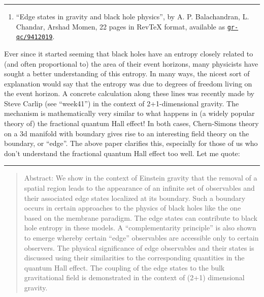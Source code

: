 \documentclass{article}
\def\tightlist{}
\begin{document}
\begin{center}\rule{0.5\linewidth}{0.5pt}\end{center}

\begin{enumerate}
\def\labelenumi{\arabic{enumi})}
\setcounter{enumi}{5}
\tightlist
\item
  ``Edge states in gravity and black hole physics'', by A. P.
  Balachandran, L. Chandar, Arshad Momen, 22 pages in RevTeX format,
  available as
  \href{http://xxx.lanl.gov/abs/gr-qc/9412019}{\texttt{gr-qc/9412019}}.
\end{enumerate}

Ever since it started seeming that black holes have an entropy closely
related to (and often proportional to) the area of their event horizons,
many physicists have sought a better understanding of this entropy. In
many ways, the nicest sort of explanation would say that the entropy was
due to degrees of freedom living on the event horizon. A concrete
calculation along these lines was recently made by Steve Carlip (see
``week41'') in the context of 2+1-dimensional gravity. The mechanism is
mathematically very similar to what happens in (a widely popular theory
of) the fractional quantum Hall effect! In both cases, Chern-Simons
theory on a 3d manifold with boundary gives rise to an interesting field
theory on the boundary, or ``edge''. The above paper clarifies this,
especially for those of us who don't understand the fractional quantum
Hall effect too well. Let me quote:

\begin{center}\rule{0.5\linewidth}{0.5pt}\end{center}

\begin{quote}
Abstract: We show in the context of Einstein gravity that the removal of
a spatial region leads to the appearance of an infinite set of
observables and their associated edge states localized at its boundary.
Such a boundary occurs in certain approaches to the physics of black
holes like the one based on the membrane paradigm. The edge states can
contribute to black hole entropy in these models. A ``complementarity
principle'' is also shown to emerge whereby certain ``edge'' observables
are accessible only to certain observers. The physical significance of
edge observables and their states is discussed using their similarities
to the corresponding quantities in the quantum Hall effect. The coupling
of the edge states to the bulk gravitational field is demonstrated in
the context of (2+1) dimensional gravity.
\end{quote}
\end{document}
